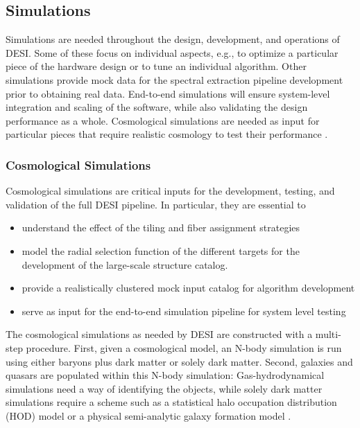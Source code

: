 \subsection{Simulations}
Simulations are needed throughout the design, development, and operations of DESI. Some of
these focus on individual aspects, e.g., to optimize a particular piece of the hardware design or
to tune an individual algorithm. Other simulations provide mock data for the spectral extraction
pipeline development prior to obtaining real data. End-to-end simulations will ensure system-level
integration and scaling of the software, while also validating the design performance as a whole.
Cosmological simulations are needed as input for particular pieces that require realistic cosmology
to test their performance \cite{Aghamousa:2016sne}.
\subsubsection{Cosmological Simulations}
Cosmological simulations are critical inputs for the development, testing, and validation of the full
DESI pipeline. In particular, they are essential to
\begin{itemize}
	\item understand the effect of the tiling and fiber assignment strategies
	\item model the radial selection function of the different targets for the development of the large-scale structure catalog.
	\item  provide a realistically clustered mock input catalog for algorithm development
	\item serve as input for the end-to-end simulation pipeline for system level testing
\end{itemize}
The cosmological simulations as needed by DESI are constructed with a multi-step procedure.
First, given a cosmological model, an N-body simulation is run using either baryons plus dark matter
or solely dark matter. Second, galaxies and quasars are populated within this N-body simulation:
Gas-hydrodynamical simulations need a way of identifying the objects, while solely dark matter
simulations require a scheme such as a statistical halo occupation distribution (HOD) model or
a physical semi-analytic galaxy formation model \cite{Aghamousa:2016sne}.
